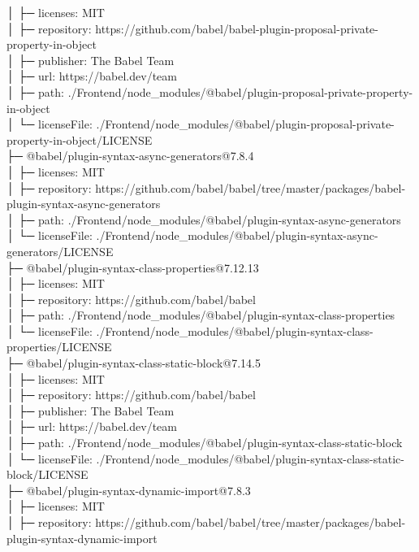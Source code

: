 │  ├─ licenses: MIT\\
│  ├─ repository: https://github.com/babel/babel-plugin-proposal-private-property-in-object\\
│  ├─ publisher: The Babel Team\\
│  ├─ url: https://babel.dev/team\\
│  ├─ path: ./Frontend/node\_modules/@babel/plugin-proposal-private-property-in-object\\
│  └─ licenseFile: ./Frontend/node\_modules/@babel/plugin-proposal-private-property-in-object/LICENSE\\
├─ @babel/plugin-syntax-async-generators@7.8.4\\
│  ├─ licenses: MIT\\
│  ├─ repository: https://github.com/babel/babel/tree/master/packages/babel-plugin-syntax-async-generators\\
│  ├─ path: ./Frontend/node\_modules/@babel/plugin-syntax-async-generators\\
│  └─ licenseFile: ./Frontend/node\_modules/@babel/plugin-syntax-async-generators/LICENSE\\
├─ @babel/plugin-syntax-class-properties@7.12.13\\
│  ├─ licenses: MIT\\
│  ├─ repository: https://github.com/babel/babel\\
│  ├─ path: ./Frontend/node\_modules/@babel/plugin-syntax-class-properties\\
│  └─ licenseFile: ./Frontend/node\_modules/@babel/plugin-syntax-class-properties/LICENSE\\
├─ @babel/plugin-syntax-class-static-block@7.14.5\\
│  ├─ licenses: MIT\\
│  ├─ repository: https://github.com/babel/babel\\
│  ├─ publisher: The Babel Team\\
│  ├─ url: https://babel.dev/team\\
│  ├─ path: ./Frontend/node\_modules/@babel/plugin-syntax-class-static-block\\
│  └─ licenseFile: ./Frontend/node\_modules/@babel/plugin-syntax-class-static-block/LICENSE\\
├─ @babel/plugin-syntax-dynamic-import@7.8.3\\
│  ├─ licenses: MIT\\
│  ├─ repository: https://github.com/babel/babel/tree/master/packages/babel-plugin-syntax-dynamic-import\\
